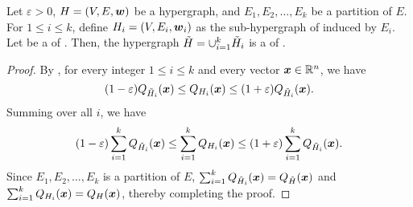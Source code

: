 \begin{lemma}[Decomposability] \label{lem:decomposability}
Let \( \varepsilon > 0 \), \( { H} = (V, E, \boldsymbol{w}) \) be a hypergraph, and \( E_1, E_2, \dots, E_k \) be a partition of \( E \).
For \( 1 \leq i \leq k \), define \( { H_i} = (V, E_i, \boldsymbol{w}_i ) \) as the sub-hypergraph of  induced by \( E_i \).
Let  be a \SpectralHypersparsifier{} of .
Then, the hypergraph \( { \tilde H} = \cup_{i = 1} ^k { \tilde H_i} \) is a \SpectralHypersparsifier{} of .
\end{lemma}
\begin{proof}
By , for every integer \( 1 \leq i \leq k \) and every vector \( \boldsymbol{x} \in \mathbb R ^n \), we have
\begin{equation*}
(1 - \varepsilon) Q_{{ \tilde H_i}}(\boldsymbol{x}) \leq Q_{{ H_i}}(\boldsymbol{x}) \leq (1 + \varepsilon) Q_{{ \tilde H_i}}(\boldsymbol{x}).
\end{equation*}
Summing over all \( i \), we have
\begin{equation*}
(1 - \varepsilon) \sum_{i = 1} ^k Q_{{ \tilde H_i}}(\boldsymbol{x}) \leq \sum_{i = 1} ^k Q_{{ H_i}}(\boldsymbol{x})
\leq (1 + \varepsilon) \sum_{i = 1} ^k Q_{{ \tilde H_i}}(\boldsymbol{x}).
\end{equation*}
Since \( E_1, E_2, \dots, E_k \) is a partition of \( E \), \( \sum_{i = 1} ^k Q_{{ \tilde H_i}}(\boldsymbol{x}) = Q_{{ \tilde H}}(\boldsymbol{x}) \) and \( \sum_{i = 1} ^k Q_{{ H_i}}(\boldsymbol{x}) = Q_{{ H}}(\boldsymbol{x}) \), thereby completing the proof.
\end{proof}





